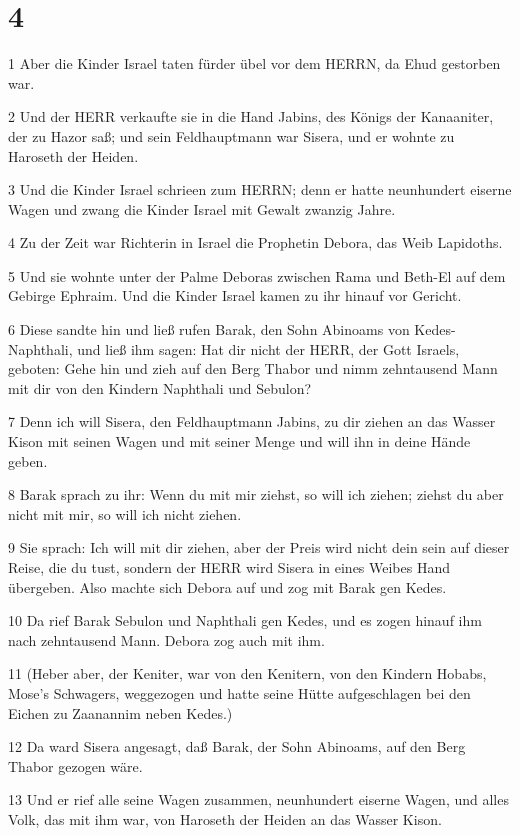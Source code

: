 \chapter{4}

\par 1 Aber die Kinder Israel taten fürder übel vor dem HERRN, da Ehud gestorben war.
\par 2 Und der HERR verkaufte sie in die Hand Jabins, des Königs der Kanaaniter, der zu Hazor saß; und sein Feldhauptmann war Sisera, und er wohnte zu Haroseth der Heiden.
\par 3 Und die Kinder Israel schrieen zum HERRN; denn er hatte neunhundert eiserne Wagen und zwang die Kinder Israel mit Gewalt zwanzig Jahre.
\par 4 Zu der Zeit war Richterin in Israel die Prophetin Debora, das Weib Lapidoths.
\par 5 Und sie wohnte unter der Palme Deboras zwischen Rama und Beth-El auf dem Gebirge Ephraim. Und die Kinder Israel kamen zu ihr hinauf vor Gericht.
\par 6 Diese sandte hin und ließ rufen Barak, den Sohn Abinoams von Kedes-Naphthali, und ließ ihm sagen: Hat dir nicht der HERR, der Gott Israels, geboten: Gehe hin und zieh auf den Berg Thabor und nimm zehntausend Mann mit dir von den Kindern Naphthali und Sebulon?
\par 7 Denn ich will Sisera, den Feldhauptmann Jabins, zu dir ziehen an das Wasser Kison mit seinen Wagen und mit seiner Menge und will ihn in deine Hände geben.
\par 8 Barak sprach zu ihr: Wenn du mit mir ziehst, so will ich ziehen; ziehst du aber nicht mit mir, so will ich nicht ziehen.
\par 9 Sie sprach: Ich will mit dir ziehen, aber der Preis wird nicht dein sein auf dieser Reise, die du tust, sondern der HERR wird Sisera in eines Weibes Hand übergeben. Also machte sich Debora auf und zog mit Barak gen Kedes.
\par 10 Da rief Barak Sebulon und Naphthali gen Kedes, und es zogen hinauf ihm nach zehntausend Mann. Debora zog auch mit ihm.
\par 11 (Heber aber, der Keniter, war von den Kenitern, von den Kindern Hobabs, Mose's Schwagers, weggezogen und hatte seine Hütte aufgeschlagen bei den Eichen zu Zaanannim neben Kedes.)
\par 12 Da ward Sisera angesagt, daß Barak, der Sohn Abinoams, auf den Berg Thabor gezogen wäre.
\par 13 Und er rief alle seine Wagen zusammen, neunhundert eiserne Wagen, und alles Volk, das mit ihm war, von Haroseth der Heiden an das Wasser Kison.
